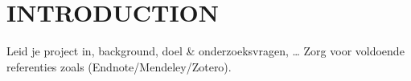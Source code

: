 \section{INTRODUCTION}
Leid je project in, background, doel \& onderzoeksvragen, \dots 
Zorg voor voldoende referenties zoals \cite{knuth:1984} \cite{latex2e}(Endnote/Mendeley/Zotero).